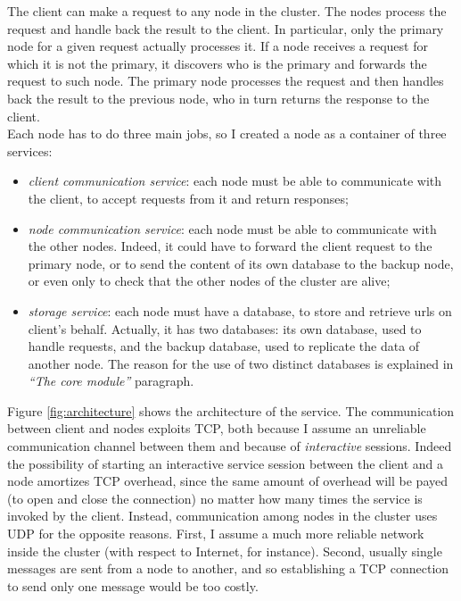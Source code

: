 \documentclass{article}
\begin{document}
The client can make a request to any node in the cluster. The nodes process the request and handle back the result to the client. In particular, only the primary node for a given request actually processes it. If a node receives a request for which it is not the primary, it discovers who is the primary and forwards the request to such node. The primary node processes the request and then handles back the result to the previous node, who in turn returns the response to the client. \\
Each node has to do three main jobs, so I created a node as a container of three services: 
\begin{itemize}
\item \textit{client communication service}: each node must be able to communicate with the client, to accept requests from it and return responses;
\item \textit{node communication service}: each node must be able to communicate with the other nodes. Indeed, it could have to forward the client request to the primary node, or to send the content of its own database to the backup node, or even only to check that the other nodes of the cluster are alive;
\item \textit{storage service}: each node must have a database, to store and retrieve urls on client's behalf. Actually, it has two databases: its own database, used to handle requests, and the backup database, used to replicate the data of another node. The reason for the use of two distinct databases is explained in \textit{``The core module''} paragraph. 
\end{itemize}
Figure \ref{fig:architecture} shows the architecture of the service. The communication between client and nodes exploits TCP, both because I assume an unreliable communication channel between them and because of \textit{interactive} sessions. Indeed the possibility of starting an interactive service session between the client and a node amortizes TCP overhead, since the same amount of overhead will be payed (to open and close the connection) no matter how many times the service is invoked by the client. Instead, communication among nodes in the cluster uses UDP for the opposite reasons. First, I assume a much more reliable network inside the cluster (with respect to Internet, for instance). Second, usually single messages are sent from a node to another, and so establishing a TCP connection to send only one message would be too costly.
\end{document}
